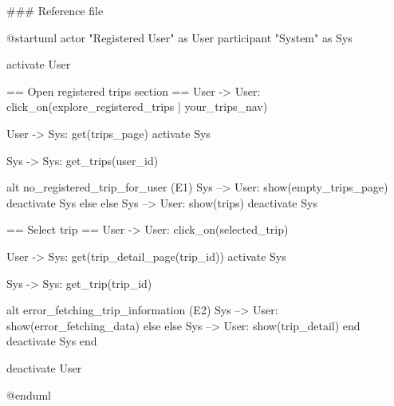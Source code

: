 ### Reference file

@startuml
actor "Registered User" as User
participant "System" as Sys

activate User

== Open registered trips section ==
User -> User: click_on(explore_registered_trips | your_trips_nav)

User -> Sys: get(trips_page)
activate Sys

Sys -> Sys: get_trips(user_id)

alt no_registered_trip_for_user (E1)
    Sys --> User: show(empty_trips_page)
    deactivate Sys
else else
    Sys --> User: show(trips)
    deactivate Sys

    == Select trip ==
    User -> User: click_on(selected_trip)

    User -> Sys: get(trip_detail_page(trip_id))
    activate Sys

    Sys -> Sys: get_trip(trip_id)

    alt error_fetching_trip_information (E2)
        Sys --> User: show(error_fetching_data)
    else else
        Sys --> User: show(trip_detail)
    end
    deactivate Sys
end

deactivate User

@enduml
